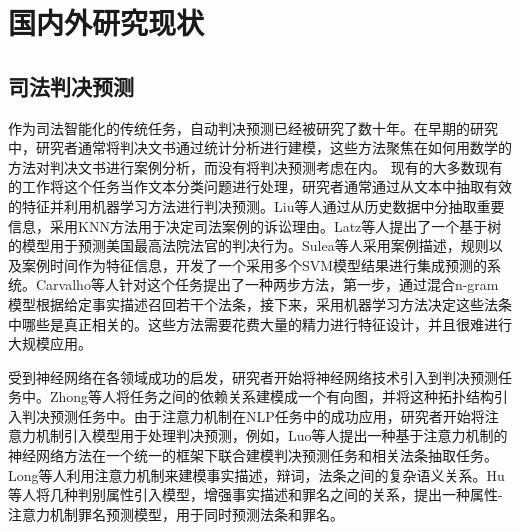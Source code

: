 \section{国内外研究现状}
\subsection{司法判决预测}
作为司法智能化的传统任务，自动判决预测已经被研究了数十年。在早期的研究中，研究者通常将判决文书通过统计分析进行建模\cite{LiuC03, kort1957predicting, nagel1963applying, ulmer1963quantitative, keown1980mathematical}，这些方法聚焦在如何用数学的方法对判决文书进行案例分析，而没有将判决预测考虑在内。
现有的大多数现有的工作将这个任务当作文本分类问题进行处理，研究者通常通过从文本中抽取有效的特征并利用机器学习方法进行判决预测\cite{kim2014legal, AletrasTPL16, liu2015predicting}。Liu等人通过从历史数据中分抽取重要信息，采用KNN方法用于决定司法案例的诉讼理由\cite{LiuCH04}。Latz等人提出了一个基于树的模型用于预测美国最高法院法官的判决行为\cite{KatzBB14}。Sulea等人采用案例描述，规则以及案例时间作为特征信息，开发了一个采用多个SVM模型结果进行集成预测的系统\cite{Sulea2017Exploring}。Carvalho等人针对这个任务提出了一种两步方法，第一步，通过混合n-gram模型根据给定事实描述召回若干个法条，接下来，采用机器学习方法决定这些法条中哪些是真正相关的\cite{carvalho2015lexical}。这些方法需要花费大量的精力进行特征设计，并且很难进行大规模应用。

受到神经网络在各领域成功的启发\cite{Kim14, BordesGWB12, LuongSLVZ15}，研究者开始将神经网络技术引入到判决预测任务中。Zhong等人将任务之间的依赖关系建模成一个有向图，并将这种拓扑结构引入判决预测任务中\cite{ZhongGTX0S18}。由于注意力机制在NLP任务中的成功应用，研究者开始将注意力机制引入模型用于处理判决预测，例如，Luo等人提出一种基于注意力机制的神经网络方法在一个统一的框架下联合建模判决预测任务和相关法条抽取任务\cite{luo2017learning}。Long等人利用注意力机制来建模事实描述，辩词，法条之间的复杂语义关系\cite{abs-1809-06537}。Hu等人将几种判别属性引入模型，增强事实描述和罪名之间的关系，提出一种属性-注意力机制罪名预测模型，用于同时预测法条和罪名\cite{C18-1041}。


